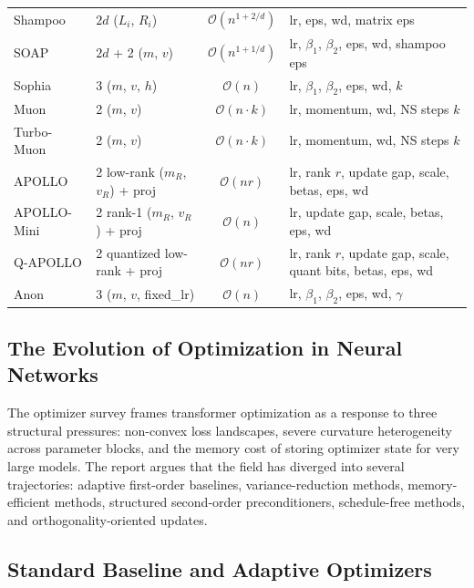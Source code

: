 \documentclass[11pt,a4paper]{article}
\begin{document}
\begin{longtable}{llcl}
Shampoo & $2d$ ($L_i$, $R_i$) & $\mathcal{O}(n^{1+2/d})$ & lr, eps, wd, matrix eps \\
SOAP & $2d$ + 2 ($m$, $v$) & $\mathcal{O}(n^{1+1/d})$ & lr, $\beta_1$, $\beta_2$, eps, wd, shampoo eps \\
Sophia & 3 ($m$, $v$, $h$) & $\mathcal{O}(n)$ & lr, $\beta_1$, $\beta_2$, eps, wd, $k$ \\
Muon & 2 ($m$, $v$) & $\mathcal{O}(n \cdot k)$ & lr, momentum, wd, NS steps $k$ \\
Turbo-Muon & 2 ($m$, $v$) & $\mathcal{O}(n \cdot k)$ & lr, momentum, wd, NS steps $k$ \\
APOLLO & 2 low-rank ($m_R$, $v_R$) + proj & $\mathcal{O}(nr)$ & lr, rank $r$, update gap, scale, betas, eps, wd \\
APOLLO-Mini & 2 rank-1 ($m_R$, $v_R$) + proj & $\mathcal{O}(n)$ & lr, update gap, scale, betas, eps, wd \\
Q-APOLLO & 2 quantized low-rank + proj & $\mathcal{O}(nr)$ & lr, rank $r$, update gap, scale, quant bits, betas, eps, wd \\
Anon & 3 ($m$, $v$, fixed\_lr) & $\mathcal{O}(n)$ & lr, $\beta_1$, $\beta_2$, eps, wd, $\gamma$ \\
\end{longtable}

\subsection{The Evolution of Optimization in Neural Networks}
The optimizer survey frames transformer optimization as a response to three structural pressures: non-convex loss landscapes, severe curvature heterogeneity across parameter blocks, and the memory cost of storing optimizer state for very large models. The report argues that the field has diverged into several trajectories: adaptive first-order baselines, variance-reduction methods, memory-efficient methods, structured second-order preconditioners, schedule-free methods, and orthogonality-oriented updates.

\subsection{Standard Baseline and Adaptive Optimizers}
\end{document}
